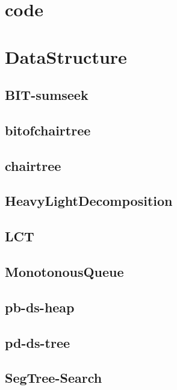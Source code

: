\section{code}

\section{DataStructure}
\subsection{BIT-sumseek}
\raggedbottom
\hrulefill
\subsection{bitofchairtree}
\raggedbottom
\hrulefill
\subsection{chairtree}
\raggedbottom
\hrulefill
\subsection{HeavyLightDecomposition}
\raggedbottom
\hrulefill
\subsection{LCT}
\raggedbottom
\hrulefill
\subsection{MonotonousQueue}
\raggedbottom
\hrulefill
\subsection{pb-ds-heap}
\raggedbottom
\hrulefill
\subsection{pd-ds-tree}
\raggedbottom
\hrulefill
\subsection{SegTree-Search}
\raggedbottom
\hrulefill
